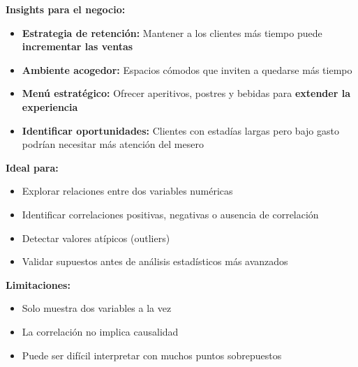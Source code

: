 \documentclass[
  spanish,
  letterpaper,
  DIV=11,
  numbers=noendperiod]{scrreprt}
\providecommand{\tightlist}{%
  \setlength{\itemsep}{0pt}\setlength{\parskip}{0pt}}
\begin{document}
\textbf{Insights para el negocio:}

\begin{itemize}
\tightlist
\item
  \textbf{Estrategia de retención:} Mantener a los clientes más tiempo
  puede \textbf{incrementar las ventas}
\item
  \textbf{Ambiente acogedor:} Espacios cómodos que inviten a quedarse
  más tiempo
\item
  \textbf{Menú estratégico:} Ofrecer aperitivos, postres y bebidas para
  \textbf{extender la experiencia}
\item
  \textbf{Identificar oportunidades:} Clientes con estadías largas pero
  bajo gasto podrían necesitar más atención del mesero
\end{itemize}

\begin{tcolorbox}[enhanced jigsaw, toptitle=1mm, opacitybacktitle=0.6, leftrule=.75mm, arc=.35mm, title=\textcolor{quarto-callout-note-color}{\faInfo}\hspace{0.5em}{¿Cuándo usar un gráfico de dispersión?}, colback=white, bottomrule=.15mm, colbacktitle=quarto-callout-note-color!10!white, opacityback=0, bottomtitle=1mm, breakable, rightrule=.15mm, coltitle=black, left=2mm, titlerule=0mm, colframe=quarto-callout-note-color-frame, toprule=.15mm]

\textbf{Ideal para:}

\begin{itemize}
\tightlist
\item
  Explorar relaciones entre dos variables numéricas
\item
  Identificar correlaciones positivas, negativas o ausencia de
  correlación\\
\item
  Detectar valores atípicos (outliers)
\item
  Validar supuestos antes de análisis estadísticos más avanzados
\end{itemize}

\textbf{Limitaciones:}

\begin{itemize}
\tightlist
\item
  Solo muestra dos variables a la vez
\item
  La correlación no implica causalidad
\item
  Puede ser difícil interpretar con muchos puntos sobrepuestos
\end{itemize}

\end{tcolorbox}
\end{document}
